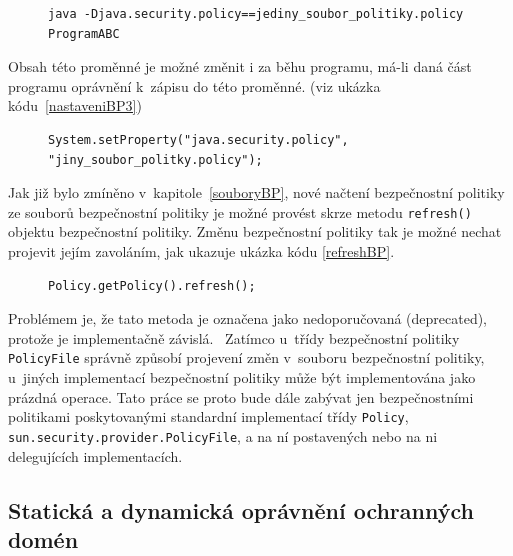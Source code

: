 \begin{figure}[t]
\begin{lstlisting}[caption=Spuštění JVM jen s~vlastním souborem bezpečnostní politiky, label=nastaveniBP2]
java -Djava.security.policy==jediny_soubor_politiky.policy ProgramABC
\end{lstlisting}
\end{figure}

Obsah této proměnné je možné změnit i za běhu programu, má-li daná část programu oprávnění k~zápisu do této proměnné. (viz ukázka kódu~\ref{nastaveniBP3})

\begin{figure}[tbh]
\begin{lstlisting}[caption=Nastavení souboru bezpečnostní politiky zevnitř JVM, label=nastaveniBP3]
System.setProperty("java.security.policy", "jiny_soubor_politky.policy");
\end{lstlisting}
\end{figure}

Jak již bylo zmíněno v~kapitole~\ref{souboryBP}, nové načtení bezpečnostní politiky ze souborů bezpečnostní politiky je možné provést
skrze metodu {\tt refresh()} objektu bezpečnostní politiky.
Změnu bezpečnostní politiky tak je možné nechat projevit jejím zavoláním, jak ukazuje ukázka kódu \ref{refreshBP}.

\begin{figure}[tbh]
\begin{lstlisting}[caption=Znovunačtení souboru bezpečnostní politiky, label=refreshBP]
Policy.getPolicy().refresh();
\end{lstlisting}
\end{figure}

Problémem je, že tato metoda je označena jako nedoporučovaná (deprecated), protože je implementačně závislá.~\cite{refPolicy}
Zatímco u~třídy bezpečnostní politiky {\tt PolicyFile} správně způsobí projevení změn v~souboru bezpečnostní politiky, u~jiných implementací bezpečnostní politiky může být implementována jako prázdná operace.
Tato práce se proto bude dále zabývat jen bezpečnostními politikami poskytovanými standardní implementací třídy {\tt Policy}, {\tt sun.security.provider.PolicyFile}, a na ní postavených nebo na ni delegujících implementacích.

\subsection{Statická a dynamická oprávnění ochranných domén} \label{staticPerm}


